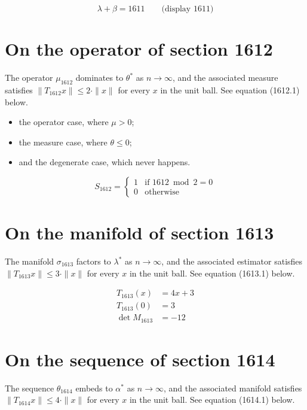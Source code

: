 \documentclass{article}
\begin{document}
$$
\lambda + \beta = 1611 \qquad \text{(display 1611)}
$$

\section{On the operator of section 1612}
The operator $\mu_{1612}$ dominates to $\theta^{*}$ as $n \to \infty$,
and the associated measure satisfies $\|T_{1612} x\| \leq 2 \cdot \|x\|$
for every $x$ in the unit ball. See equation (1612.1) below.

\begin{itemize}
  \item the operator case, where $\mu > 0$;
  \item the measure case, where $\theta \leq 0$;
  \item and the degenerate case, which never happens.
\end{itemize}

\begin{equation}
S_{1612} = \begin{cases} 1 & \text{if } 1612 \bmod 2 = 0 \\ 0 & \text{otherwise} \end{cases}
\end{equation}

\section{On the manifold of section 1613}
The manifold $\sigma_{1613}$ factors to $\lambda^{*}$ as $n \to \infty$,
and the associated estimator satisfies $\|T_{1613} x\| \leq 3 \cdot \|x\|$
for every $x$ in the unit ball. See equation (1613.1) below.

\begin{align}
T_{1613}(x) &= 4 x + 3 \\
T_{1613}(0) &= 3 \\
\det M_{1613} &= -12
\end{align}

\section{On the sequence of section 1614}
The sequence $\theta_{1614}$ embeds to $\alpha^{*}$ as $n \to \infty$,
and the associated manifold satisfies $\|T_{1614} x\| \leq 4 \cdot \|x\|$
for every $x$ in the unit ball. See equation (1614.1) below.
\end{document}
